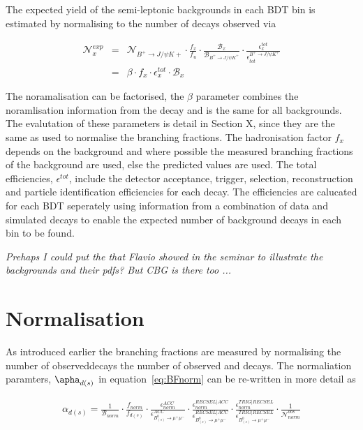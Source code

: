 The expected yield of the semi-leptonic backgrounds in each BDT bin is estimated by normalising to the number of \bujpsik decays observed via

\begin{eqnarray}
\mathcal{N}^{exp}_{x} &=& \mathcal{N}_{B^{+} \to J/\psi K{+}} \cdot \frac{f_{x}}{f_{u}} \cdot \frac{\mathcal{B}_{x}}{\mathcal{B}_{B^{+} \to J/\psi K^{+}}} \cdot \frac{\epsilon^{tot}_{x}}{\epsilon_{tot}^{B^{+} \to J/\psi K^{+}}} \\
&=& \beta \cdot f_{x} \cdot \epsilon^{tot}_{x} \cdot \mathcal{B}_{x}
\label{eq:BkgndPredict}
\end{eqnarray}

The noramalisation can be factorised, the $\beta$ parameter combines the noramlisation information from the \bujpsik decay and is the same for all backgrounds. The evalutation of these parameters is detail in Section X, since they are the same as used to normalise the \bmumu branching fractions. The hadronisation factor $f_{x}$ depends on the background and where possible the measured branching fractions of the background are used, else the predicted values are used. 
The total efficiencies, $\epsilon^{tot}$, include the detector acceptance, trigger, selection, reconstruction and particle identification efficiencies for each decay. The efficiencies are calucated for each BDT seperately using information from a combination of data and simulated decays to enable the expected number of background decays in each bin to be found.

{\it Prehaps I could put the \pdf that Flavio showed in the seminar to illustrate the backgrounds and their pdfs? But CBG is there too ...}

\section{Normalisation}
\label{sec:Normalisation}

As introduced earlier the \bmumu branching fractions are measured by normalising the number of observed\bmumu decays the number of observed \bujpsik and \bdkpi decays. The normaliation paramters, $\apha_{d(s)}$ in equation~\ref{eq:BFnorm} can be re-written in more detail as


\begin{eqnarray}
 \alpha_{d(s)} = \frac{1}{\mathcal{B}_{norm}} \cdot \frac{f_{norm}}{f_{d(s)}} \cdot \frac{\epsilon^{ACC}_{norm}}{\epsilon^{ACC}_{B^{0}_{(s)} \to \mu^{+} \mu^{-}}} \cdot \frac{\epsilon^{RECSEL|ACC}_{norm}}{\epsilon^{RECSEL|ACC}_{B^{0}_{(s)} \to \mu^{+} \mu^{-}}} \cdot \frac{\epsilon^{TRIG|RECSEL}_{norm}}{\epsilon^{TRIG|RECSEL}_{B^{0}_{(s)} \to \mu^{+} \mu^{-}}} \cdot \frac{1}{\mathcal{N}^{obs}_{norm}}

\label{eq:BFnormDetailed}
\end{eqnarray}


